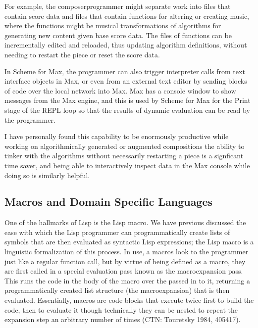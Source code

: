 \documentclass[letterpaper,10pt,english]{sphinxmanual}
\begin{document}
\sphinxAtStartPar
For example, the composer\sphinxhyphen{}programmer might separate work into files that contain score data and files
that contain functions for altering or creating music, where the functions might be musical transformations of
algorithms for generating new content given base score data.
The files of functions can be incrementally edited and reloaded, thus updating algorithm definitions, without needing
to restart the piece or reset the score data.

\sphinxAtStartPar
In Scheme for Max, the programmer can also trigger
interpreter calls from text interface objects in Max, or even from an external text editor
by sending blocks of code over the local network into Max.
Max has a console window to show messages from the Max engine, and this is used by Scheme for Max
for the Print stage of the REPL loop so that the results of dynamic evaluation can be read by the programmer.

\sphinxAtStartPar
I have personally found this capability to be enormously productive while working on
algorithmically generated or augmented compositions \sphinxhyphen{} the ability to tinker with the algorithms
without necessarily restarting a piece is a signficant time saver, and being able to interactively
inspect data in the Max console while doing so is similarly helpful.


\subsection{Macros and Domain Specific Languages}
\label{\detokenize{design:macros-and-domain-specific-languages}}
\sphinxAtStartPar
One of the hallmarks of Lisp is the Lisp macro.
We have previous discussed the ease with which the Lisp programmer can programmatically create lists of
symbols that are then evaluated as syntactic Lisp expressions; the Lisp macro is a linguistic formalization of this process.
In use, a macros look to the programmer just like a regular function call, but by virtue of being defined as a macro,
they are first called in a special evaluation pass known as the macro\sphinxhyphen{}expansion pass.
This runs the code in the body of the macro over the  passed in to it, returning a
programmatically created list structure (the macro\sphinxhyphen{}expansion) that is then evaluated.
Essentially, macros are code blocks that execute twice \sphinxhyphen{} first to build the code, then to evaluate it \sphinxhyphen{} though
technically they can be nested to repeat the expansion step an arbitrary number of times (CTN: Touretsky 1984, 405\sphinxhyphen{}417).
\end{document}
